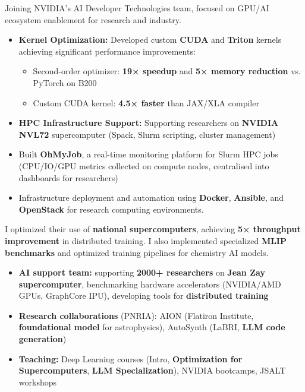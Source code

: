 \documentclass[9pt,a4paper,ragged2e,withhyper]{altacv}
\begin{document}
Joining NVIDIA's AI Developer Technologies team, focused on GPU/AI ecosystem enablement for research and industry.

\divider

\begin{itemize}
    \item \textbf{Kernel Optimization:} Developed custom \textbf{CUDA} and \textbf{Triton} kernels achieving significant performance improvements:
    \begin{itemize}
        \item Second-order optimizer: \textbf{19× speedup} and \textbf{5× memory reduction} vs. PyTorch on B200
        \item Custom CUDA kernel: \textbf{4.5× faster} than JAX/XLA compiler
    \end{itemize}
    \item \textbf{HPC Infrastructure Support:} Supporting researchers on \textbf{NVIDIA NVL72} supercomputer (Spack, Slurm scripting, cluster management)
    \item Built \textbf{OhMyJob}, a real-time monitoring platform for Slurm HPC jobs (CPU/IO/GPU metrics collected on compute nodes, centralised into dashboards for researchers)
    \item Infrastructure deployment and automation using \textbf{Docker}, \textbf{Ansible}, and \textbf{OpenStack} for research computing environments.
\end{itemize}
\divider

I optimized their use of \textbf{national supercomputers}, achieving
\textbf{5× throughput improvement} in distributed training. I also implemented specialized
\textbf{MLIP benchmarks} and optimized training pipelines for chemistry AI models.

\divider

\begin{itemize}
\item \textbf{AI support team:} supporting \textbf{2000+ researchers} on \textbf{Jean Zay supercomputer}, benchmarking hardware accelerators (NVIDIA/AMD GPUs, GraphCore IPU), developing tools for \textbf{distributed training}
\item \textbf{Research collaborations} (PNRIA): AION (Flatiron Institute, \textbf{foundational model} for astrophysics), AutoSynth (LaBRI, \textbf{LLM code generation})
\item \textbf{Teaching:} Deep Learning courses (Intro, \textbf{Optimization for Supercomputers}, \textbf{LLM Specialization}), NVIDIA bootcamps, JSALT workshops
\end{itemize}
\end{document}
